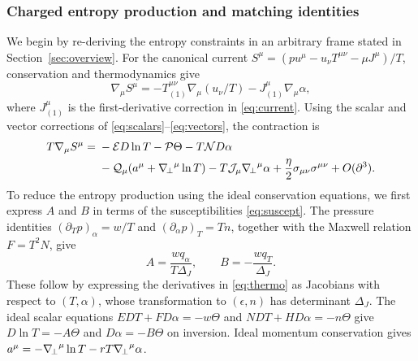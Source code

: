 \subsubsection*{Charged entropy production and matching identities}
\label{app:sec:charged-entropy}
We begin by re-deriving the entropy constraints in an arbitrary frame stated in Section~\ref{sec:overview}. For the canonical current
$S^\mu=(p u^\mu-u_\nu T^{\mu\nu}-\mu J^\mu)/T$, conservation and
thermodynamics give
\begin{equation}
 \nabla_\mu S^\mu=-T_{(1)}^{\mu\nu}\nabla_\mu(u_\nu/T)
                         -J_{(1)}^\mu\nabla_\mu\alpha,
\end{equation}
where $J_{(1)}^\mu$ is the first-derivative correction in \eqref{eq:current}.
Using the scalar and vector corrections of \eqref{eq:scalars}--\eqref{eq:vectors},
the contraction is
\begin{equation}\label{app:charged-entropy-contraction}
 \begin{aligned}
 T\nabla_\mu S^\mu={}&-\mathcal E D\ln T-\mathcal P\Theta-T\mathcal N D\alpha\\
 &-\mathcal Q_\mu(a^\mu+{\nabla_{\!\perp}}^\mu\ln T)
 -T\mathcal J_\mu{\nabla_{\!\perp}}^\mu\alpha
 +\frac\eta2\sigma_{\mu\nu}\sigma^{\mu\nu}+O(\partial^3).
 \end{aligned}
\end{equation}
To reduce the entropy production using the ideal conservation equations,
we first express $A$ and $B$ in terms of the susceptibilities
\eqref{eq:suscept}. The pressure identities
$(\partial_Tp)_\alpha=w/T$ and $(\partial_\alpha p)_T=Tn$, together
with the Maxwell relation $F=T^2N$, give
\begin{equation}\label{app:eq:charged-uplift-thermo}
 A=\frac{wq_\alpha}{T{\Delta_J}},\qquad
 B=-\frac{wq_T}{{\Delta_J}}.
\end{equation}
These follow by expressing the derivatives in \eqref{eq:thermo} as
Jacobians with respect to $(T,\alpha)$, whose transformation to
$(\epsilon,n)$ has determinant $\Delta_J$.
The ideal scalar equations
$E D T+F D\alpha=-w\Theta$ and $N D T+H D\alpha=-n\Theta$
give $D\ln T=-A\Theta$ and $D\alpha=-B\Theta$ on inversion.
Ideal momentum conservation gives
$a^\mu=-{\nabla_{\!\perp}}^\mu\ln T-rT{\nabla_{\!\perp}}^\mu\alpha$.


